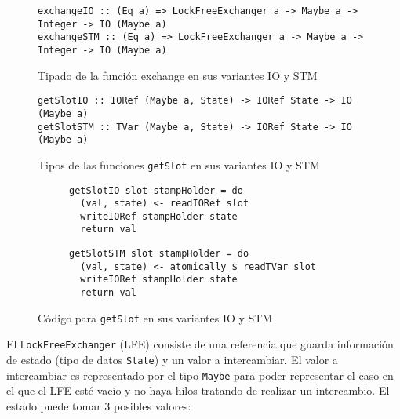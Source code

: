 \begin{figure}[t]
  \centering
  \begin{verbatim}
exchangeIO :: (Eq a) => LockFreeExchanger a -> Maybe a -> Integer -> IO (Maybe a)
exchangeSTM :: (Eq a) => LockFreeExchanger a -> Maybe a -> Integer -> IO (Maybe a)
  \end{verbatim}
  \caption{Tipado de la función exchange en sus variantes IO y STM}
  \label{fig:exchange-types}
\end{figure}

\begin{figure}[t]
  \centering
  \begin{verbatim}
getSlotIO :: IORef (Maybe a, State) -> IORef State -> IO (Maybe a)
getSlotSTM :: TVar (Maybe a, State) -> IORef State -> IO (Maybe a)
  \end{verbatim}
  \caption{Tipos de las funciones \texttt{getSlot} en sus variantes IO y STM}
  \label{fig:getSlot-types}
\end{figure}

\begin{figure}[t]
  \centering
    \begin{subfigure}[b]{0.4\textwidth}
    \begin{verbatim}
getSlotIO slot stampHolder = do
  (val, state) <- readIORef slot
  writeIORef stampHolder state
  return val
    \end{verbatim}
  \end{subfigure}
  \begin{subfigure}[b]{0.5\textwidth}
    \begin{verbatim}
getSlotSTM slot stampHolder = do
  (val, state) <- atomically $ readTVar slot
  writeIORef stampHolder state
  return val
    \end{verbatim}
  \end{subfigure}
  \caption{Código para \texttt{getSlot} en sus variantes IO y STM}
  \label{fig:getSlot-code}
\end{figure}

El \texttt{LockFreeExchanger} (LFE) consiste de una referencia que guarda información de estado (tipo de datos \texttt{State}) y un valor a intercambiar.
El valor a intercambiar es representado por el tipo \texttt{Maybe} para poder representar el caso en el que el LFE esté vacío y no haya hilos tratando de realizar un intercambio.
El estado puede tomar 3 posibles valores:

